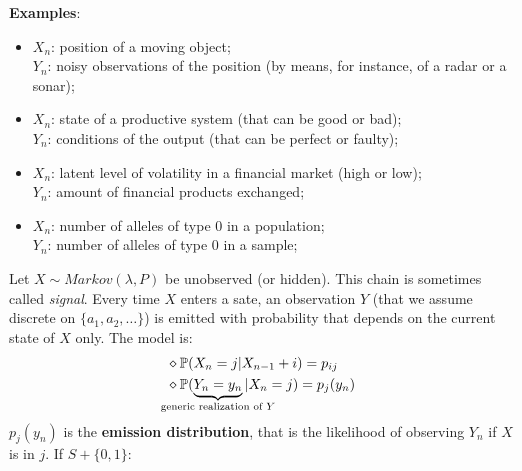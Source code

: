 \documentclass{article}
\begin{document}
\textbf{Examples}:\begin{itemize}
    \item $X_n$: position of a moving object;\\
    $Y_n$: noisy observations of the position (by means, for instance, of a radar or a sonar);
    \item $X_n$: state of a productive system (that can be good or bad);\\
    $Y_n$: conditions of the output (that can be perfect or faulty);
    \item $X_n$: latent level of volatility in a financial market (high or low);\\
    $Y_n$: amount of financial products exchanged;
    \item $X_n$: number of alleles of type 0 in a population;\\
    $Y_n$: number of alleles of type 0 in a sample;
\end{itemize}
Let $X\sim Markov(\lambda, P)$ be unobserved (or hidden). This chain is sometimes called \textit{signal}. Every time $X$ enters a sate, an observation $Y$ (that we assume discrete on $\{a_1, a_2,\ldots\}$) is emitted with probability that depends on the current state of $X$ only. The model is:
\begin{align*}
    &\diamond \prob(X_n=j|X_{n-1}+i)=p_{ij}\\
    &\diamond \prob(\underbrace{Y_n=y_n}_{\mathclap{\text{generic realization of }Y}}|X_n=j)=p_j(y_n)
\end{align*}
$p_j(y_n)$ is the \textbf{emission distribution}, that is the likelihood of observing $Y_n$ if $X$ is in $j$. If $S+\{0,1\}$:
\begin{figure}[H]
    \centering
    \label{hidden}
\end{figure}
\end{document}
